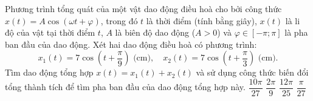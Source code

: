 \begin{ex}
	Phương trình tổng quát của một vật dao động điều hoà cho bởi công thức $x(t) = A\cos(\omega t + \varphi)$, trong đó $t$ là thời điểm (tính bằng giây), $x(t)$ là li độ của vật tại thời điểm $t$, $A$ là biên độ dao động ($A > 0$) và $\varphi \in [-\pi; \pi]$ là pha ban đầu của dao động. Xét hai dao động điều hoà có phương trình:
	$$x_1(t) = 7\cos\left(t + \dfrac{\pi}{9}\right)\text{ (cm)}, \quad x_2(t) = 7\cos\left(t + \dfrac{\pi}{3}\right)\text{ (cm)}.$$
	Tìm dao động tổng hợp $x(t) = x_1(t) + x_2(t)$ và sử dụng công thức biến đổi tổng thành tích để tìm pha ban đầu của dao động tổng hợp này.
	\choice
	{$\dfrac{10\pi}{27}$}
	{\True $\dfrac{2\pi}{9}$}
	{$\dfrac{12\pi}{25}$}
	{$\dfrac{\pi}{27}$}
\end{ex}
